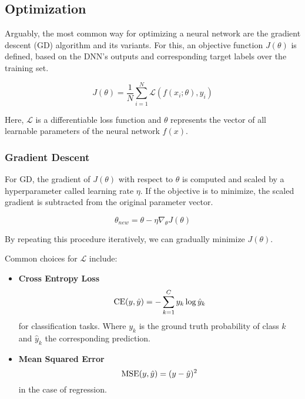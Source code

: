 \subsection{Optimization}
Arguably, the most common way for optimizing a neural network are the gradient descent (GD) algorithm and its variants. For this, an objective function $J(\theta)$ is defined, based on the DNN's outputs and corresponding target labels over the training set.

\begin{equation}
    J(\theta) = \frac{1}{N} \sum_{i=1}^{N} \mathcal{L}(f(x_i; \theta), y_i)
\end{equation}

Here, $\mathcal{L}$ is a differentiable loss function and $\theta$ represents the vector of all learnable parameters of the neural network $f(x)$.

\subsubsection{Gradient Descent}
For GD, the gradient of $J(\theta)$ with respect to $\theta$ is computed and scaled by a hyperparameter called learning rate $\eta$. If the objective is to minimize, the scaled gradient is subtracted from the original parameter vector.

\begin{equation}
    \theta_{new} = \theta - \eta\nabla_\theta J(\theta)
\end{equation}

By repeating this procedure iteratively, we can gradually minimize $J(\theta)$.

Common choices for $\mathcal{L}$ include:
\begin{itemize}
    \item \textbf{Cross Entropy Loss}
          \begin{equation}
              \text{CE}(y, \hat{y}) = - \sum_{k=1}^C y_k \log \hat{y}_k
          \end{equation}
          for classification tasks. Where $y_k$ is the ground truth probability of class $k$ and $\hat{y}_k$ the corresponding prediction.

    \item \textbf{Mean Squared Error}
          \begin{equation}
              \text{MSE}(y, \hat{y}) = (y - \hat{y})^2
          \end{equation}
          in the case of regression.
\end{itemize}

